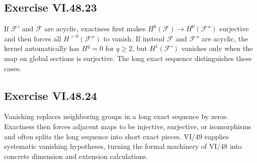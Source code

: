 \subsection*{Exercise VI.48.23}
\begin{solution}
If \(\mathcal F'\) and \(\mathcal F\) are acyclic, exactness first makes \(H^0(\mathcal F)\to H^0(\mathcal F'')\) surjective and then forces all \(H^{>0}(\mathcal F'')\) to vanish.  If instead \(\mathcal F\) and \(\mathcal F''\) are acyclic, the kernel automatically has \(H^q=0\) for \(q\ge2\), but \(H^1(\mathcal F')\) vanishes only when the map on global sections is surjective.  The long exact sequence distinguishes these cases.
\end{solution}

\subsection*{Exercise VI.48.24}
\begin{solution}
Vanishing replaces neighboring groups in a long exact sequence by zeros.  Exactness then forces adjacent maps to be injective, surjective, or isomorphisms and often splits the long sequence into short exact pieces.  VI/49 supplies systematic vanishing hypotheses, turning the formal machinery of VI/48 into concrete dimension and extension calculations.
\end{solution}

